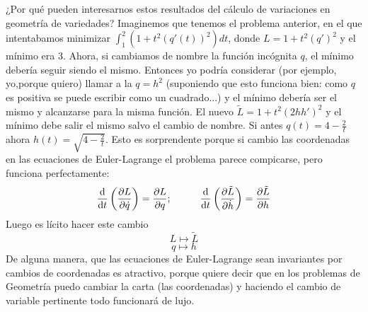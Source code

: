 \documentclass[palatino, bibnumbers]{apuntes}
\begin{document}
¿Por qué pueden interesarnos estos resultados del cálculo de variaciones en geometría de variedades? Imaginemos que tenemos el problema anterior, en el que intentabamos minimizar $\int_{1}^{2}(1+t^2(q'(t))^2)dt$, donde $L=1+t^2(q')^2$ y el mínimo era 3.
Ahora, si cambiamos de nombre la función incógnita $q$, el mínimo debería seguir siendo el mismo. Entonces yo podría considerar (por ejemplo, yo,porque quiero) llamar a la $q=h^2$  (suponiendo que esto funciona bien: como $q$ es positiva se puede escribir como un cuadrado...) y el mínimo debería ser el mismo y alcanzarse para la misma función. El nuevo $\tilde{L}=1+t^2(2hh')^2$ y el mínimo debe salir el mismo salvo el cambio de nombre. Si antes $q(t)=4-\frac{2}{t}$ ahora $h(t)=\sqrt{4-\frac{2}{t}}$. Esto es sorprendente porque si cambio las coordenadas en las ecuaciones de Euler-Lagrange el problema parece compicarse, pero funciona perfectamente:
$$\dv{t}\left(\pdv{L}{\dot{q}}\right)=\pdv{L}{q};\hspace*{1cm}\dv{t}\left(\pdv{\tilde{L}}{\dot{h}}\right)=\pdv{\tilde{L}}{h}$$
Luego es lícito hacer este cambio 
$$L\longmapsto\tilde{L}$$
$$q\longmapsto h$$
 De alguna manera, que las ecuaciones de Euler-Lagrange sean invariantes por cambios de coordenadas es atractivo, porque quiere decir que en los problemas de Geometría puedo cambiar la carta (las coordenadas) y haciendo el cambio de variable pertinente todo funcionará de lujo.
\end{document}
